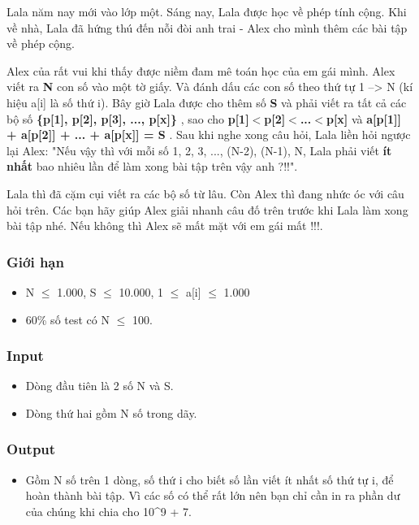 



   Lala năm nay mới vào lớp một. Sáng nay, Lala được học về phép tính cộng. Khi về nhà, Lala đã hứng thú đến nỗi đòi anh trai - Alex cho mình thêm các bài tập về phép cộng.  

   Alex của rất vui khi thấy được niềm đam mê toán học của em gái mình. Alex viết ra   \textbf{    N   }   con số vào một tờ giấy. Và đánh dấu các con số theo thứ tự 1 --> N (kí hiệu a[i] là số thứ i). Bây giờ Lala được cho thêm số   \textbf{    S   }   và phải viết ra   tất cả các bộ số\textbf{    \{p[1], p[2], p[3], ..., p[x]\}   }   ,   sao cho\textbf{    p[1]$<$p[2]$<$...$<$p[x]   }và\textbf{    a[p[1]]  + a[p[2]] + ... + a[p[x]] = S   }   . Sau khi nghe xong câu hỏi, Lala liền hỏi ngược lại Alex: "Nếu vậy thì với mỗi số 1, 2, 3, ..., (N-2), (N-1), N, Lala phải viết   \textbf{    ít nhất   }   bao nhiêu lần để làm xong bài tập trên vậy anh ?!!".  

   Lala thì đã cặm cụi viết ra các bộ số từ lâu. Còn Alex thì đang nhức óc với câu hỏi trên. Các bạn hãy giúp Alex giải nhanh câu đố trên trước khi Lala làm xong bài tập nhé. Nếu không thì Alex sẽ mất mặt với em gái mất !!!.  

\subsubsection{   Giới hạn  }
\begin{itemize}
	\item     N  $\le$  1.000, S  $\le$  10.000, 1 $\le$  a[i]  $\le$  1.000   
	\item     60\% số test có N  $\le$  100.   
\end{itemize}

\subsubsection{   Input  }
\begin{itemize}
	\item     Dòng đầu tiên là 2 số N và S.   
	\item     Dòng thứ hai gồm N số trong dãy.   
\end{itemize}

\subsubsection{   Output  }
\begin{itemize}
	\item     Gồm N số trên 1 dòng, số thứ i cho biết số lần viết        ít nhất    số thứ tự i,    để hoàn thành bài tập. Vì các số có thể rất lớn nên bạn chỉ cần in ra phần dư của chúng khi chia cho 10^9 + 7.   
\end{itemize}

